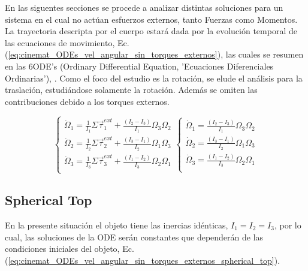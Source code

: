 \documentclass[oneside,a4paper,english,links]{amca}
\begin{document}
En las siguentes secciones se procede a analizar distintas soluciones para un sistema en el cual no act\'uan esfuerzos externos, tanto Fuerzas como Momentos. La trayectoria descripta por el cuerpo estar\'a dada por la evoluci\'on temporal de las ecuaciones de movimiento, Ec.(\ref{eq:cinemat_ODEs_vel_angular_sin_torques_externos}), las cuales se resumen en las 6ODE's (Ordinary Differential Equation, 'Ecuaciones Diferenciales Ordinarias'), \cite{landau1976mechanics}. Como el foco del estudio es la rotaci\'on, se elude el an\'alisis para la traslaci\'on, estudi\'andose solamente la rotaci\'on. Adem\'as se omiten las contribuciones debido a los torques externos.


\begin{equation}
\begin{cases}
    \dot{\Omega}_1= \frac{1}{I_{1}}\Sigma \Vec{\tau}^{ext}_1+\frac{\left(I_2-I_3\right)}{I_1}\Omega_3\Omega_2\\
    \dot{\Omega}_2=\frac{1}{I_{2}}\Sigma \Vec{\tau}^{ext}_2+\frac{\left(I_3-I_1\right)}{I_2}\Omega_1\Omega_3\\
    \dot{\Omega}_3=\frac{1}{I_{3}}\Sigma \Vec{\tau}^{ext}_3+\frac{\left(I_1-I_2\right)}{I_3}\Omega_2\Omega_1\\
\end{cases}
\begin{cases}
    \dot{\Omega}_1=\frac{\left(I_2-I_3\right)}{I_1}\Omega_3\Omega_2\\
    \dot{\Omega}_2=\frac{\left(I_3-I_1\right)}{I_2}\Omega_1\Omega_3\\
    \dot{\Omega}_3=\frac{\left(I_1-I_2\right)}{I_3}\Omega_2\Omega_1\\
    \end{cases}
    \label{eq:cinemat_ODEs_vel_angular_sin_torques_externos}
\end{equation}

\subsection{Spherical Top}
\label{sec:cinemat_An\'alsis_momentos_angulares_Aplicaciones_Ec_Euler_spherical_top}

En la presente situaci\'on el objeto tiene las inercias id\'enticas, $I_1=I_2=I_3$, por lo cual, las soluciones de la ODE ser\'an constantes que depender\'an de las condiciones iniciales del objeto,  Ec.(\ref{eq:cinemat_ODEs_vel_angular_sin_torques_externos_spherical_top}). 
\end{document}
